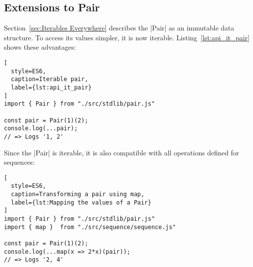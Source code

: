 \subsection{Extensions to Pair} %
\label{sub:Extensions to Pair}
Section~\ref{sec:Iterables Everywhere} describes the |Pair| as an immutable
data structure. To access its values simpler, it is now iterable.
Listing~\ref{lst:api_it_pair} shows these advantages:

\begin{lstlisting}[
  style=ES6,
  caption=Iterable pair,
  label={lst:api_it_pair}
]
import { Pair } from "./src/stdlib/pair.js"

const pair = Pair(1)(2);
console.log(...pair);
// => Logs '1, 2'
\end{lstlisting}

Since the |Pair| is iterable, it is also compatible with all operations defined
for sequences:

\begin{lstlisting}[
  style=ES6,
  caption=Transforming a pair using map,
  label={lst:Mapping the values of a Pair}
]
import { Pair } from "./src/stdlib/pair.js"
import { map }  from "./src/sequence/sequence.js"

const pair = Pair(1)(2);
console.log(...map(x => 2*x)(pair));
// => Logs '2, 4'
\end{lstlisting}


